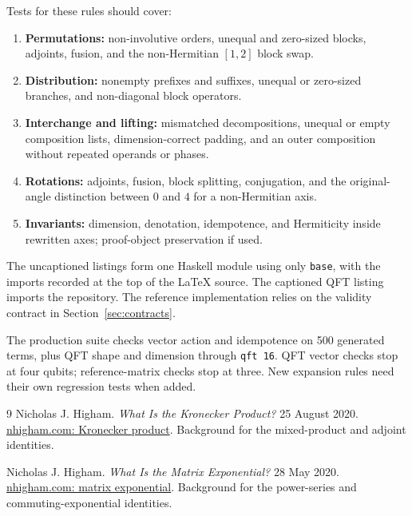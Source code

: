 \documentclass[11pt,a4paper]{article}
\newcommand{\code}[1]{\texttt{#1}}
\begin{document}
Tests for these rules should cover:
\begin{enumerate}
\item \textbf{Permutations:} non-involutive orders, unequal and zero-sized
blocks, adjoints, fusion, and the non-Hermitian $[1,2]$ block swap.
\item \textbf{Distribution:} nonempty prefixes and suffixes, unequal or
zero-sized branches, and non-diagonal block operators.
\item \textbf{Interchange and lifting:} mismatched decompositions,
unequal or empty composition lists, dimension-correct padding, and
an outer composition without repeated operands or phases.
\item \textbf{Rotations:} adjoints, fusion, block splitting, conjugation,
and the original-angle distinction between $0$ and $4$ for a
non-Hermitian axis.
\item \textbf{Invariants:} dimension, denotation, idempotence, and
Hermiticity inside rewritten axes; proof-object preservation if used.
\end{enumerate}

The uncaptioned listings form one Haskell module using only \code{base},
with the imports recorded at the top of the \LaTeX{} source. The captioned
QFT listing imports the repository. The reference implementation relies
on the validity contract in Section~\ref{sec:contracts}.

The production suite checks vector action and idempotence on 500
generated terms, plus QFT shape and dimension through \code{qft 16}.
QFT vector checks stop at four qubits; reference-matrix checks stop at
three. New expansion rules need their own regression tests when added.

\begin{thebibliography}{9}
Nicholas J. Higham.
\emph{What Is the Kronecker Product?} 25 August 2020.
\href{https://nhigham.com/2020/08/25/what-is-the-kronecker-product/}
{nhigham.com: Kronecker product}.
Background for the mixed-product and adjoint identities.

Nicholas J. Higham.
\emph{What Is the Matrix Exponential?} 28 May 2020.
\href{https://nhigham.com/2020/05/28/what-is-the-matrix-exponential/}
{nhigham.com: matrix exponential}.
Background for the power-series and commuting-exponential identities.
\end{thebibliography}
\end{document}
